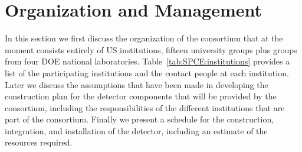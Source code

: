 \section{Organization and Management}
\label{sec:fdsp-tpcelec-management}

In this section we first discuss the organization of the 
consortium that at the moment consists entirely of US institutions, 
fifteen university groups plus groups from four DOE national 
laboratories. Table~\ref{tab:SPCE:institutions} provides a list 
of the participating institutions and the contact people at each institution. 
Later we discuss the assumptions that have been made in developing
the construction plan for the detector components that will be
provided by the  consortium, including the responsibilities
of the different institutions that are part of the consortium. Finally
we present a schedule for the construction, integration, and installation
of the detector, including an estimate of the resources required.

